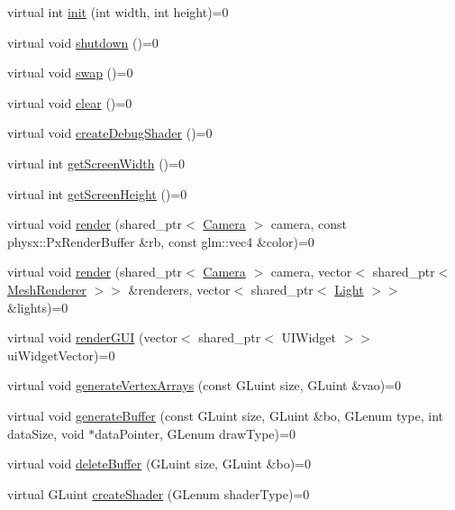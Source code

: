 \begin{DoxyCompactItemize}
\item 
virtual int \hyperlink{class_graphics_system_a7cdc16551f8da01c5271dfb64f807726}{init} (int width, int height)=0
\item 
virtual void \hyperlink{class_graphics_system_a00275fa0e3cc3b9274739b21d4ae9821}{shutdown} ()=0
\item 
virtual void \hyperlink{class_graphics_system_a24a513387448dac9db6510a01acfcaa6}{swap} ()=0
\item 
virtual void \hyperlink{class_graphics_system_acb34692fa9eb3c03c8a80ddfb6ea1e3f}{clear} ()=0
\item 
virtual void \hyperlink{class_graphics_system_a235c9266682e6521135003593409b92e}{create\+Debug\+Shader} ()=0
\item 
virtual int \hyperlink{class_graphics_system_a9ebe243b7671cf0a4486bb9ae1f458f9}{get\+Screen\+Width} ()=0
\item 
virtual int \hyperlink{class_graphics_system_a056ee98bac2643fabd540f0541707cce}{get\+Screen\+Height} ()=0
\item 
virtual void \hyperlink{class_graphics_system_a60e5c663c8b19a5fee37e40ef347e86e}{render} (shared\+\_\+ptr$<$ \hyperlink{class_camera}{Camera} $>$ camera, const physx\+::\+Px\+Render\+Buffer \&rb, const glm\+::vec4 \&color)=0
\item 
virtual void \hyperlink{class_graphics_system_a7fdefc85d986133bc43885f863cc9c7c}{render} (shared\+\_\+ptr$<$ \hyperlink{class_camera}{Camera} $>$ camera, vector$<$ shared\+\_\+ptr$<$ \hyperlink{class_mesh_renderer}{Mesh\+Renderer} $>$$>$ \&renderers, vector$<$ shared\+\_\+ptr$<$ \hyperlink{class_light}{Light} $>$$>$ \&lights)=0
\item 
virtual void \hyperlink{class_graphics_system_ac20abca82bc8163895b3f143eb53f113}{render\+G\+U\+I} (vector$<$ shared\+\_\+ptr$<$ U\+I\+Widget $>$$>$ ui\+Widget\+Vector)=0
\item 
virtual void \hyperlink{class_graphics_system_a32ab75f493e9037c83b718f5ccb11500}{generate\+Vertex\+Arrays} (const G\+Luint size, G\+Luint \&vao)=0
\item 
virtual void \hyperlink{class_graphics_system_a6ca91563b69a554462fccbcfff2d6a70}{generate\+Buffer} (const G\+Luint size, G\+Luint \&bo, G\+Lenum type, int data\+Size, void $\ast$data\+Pointer, G\+Lenum draw\+Type)=0
\item 
virtual void \hyperlink{class_graphics_system_a526e6b5fea898f4ac06ef0d0ab7b9d67}{delete\+Buffer} (G\+Luint size, G\+Luint \&bo)=0
\item 
virtual G\+Luint \hyperlink{class_graphics_system_a352afd81ae42f6415b4e28ff445e5d45}{create\+Shader} (G\+Lenum shader\+Type)=0
$$
\end{DoxyCompactItemize}
